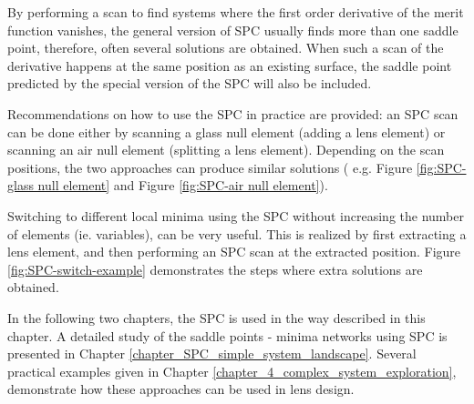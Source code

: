By performing a scan to find systems where the first order derivative of the merit function vanishes, the general version of SPC usually finds more than one saddle point, therefore, often several solutions are obtained. When such a scan of the derivative happens at the same position as an existing surface, the saddle point predicted by the special version of the SPC will also be included. 

Recommendations on how to use the SPC in practice are provided: an SPC scan can be done either by scanning a glass null element (adding a lens element) or scanning an air null element (splitting a lens element).  Depending on the scan positions, the two approaches can produce similar solutions ( e.g. Figure \ref{fig:SPC-glass null element} and Figure \ref{fig:SPC-air null element}).

Switching to different local minima using the SPC without increasing the number of elements (ie. variables), can be very useful. This is realized by first extracting a lens element, and then performing an SPC scan at the extracted position. Figure \ref{fig:SPC-switch-example} demonstrates the steps where extra solutions are obtained. 

In the following two chapters, the SPC is used in the way described in this chapter. A detailed study of the saddle points - minima networks using SPC is presented in Chapter \ref{chapter_SPC_simple_system_landscape}. Several practical examples given in Chapter \ref{chapter_4_complex_system_exploration}, demonstrate how these approaches can be used in lens design. 



